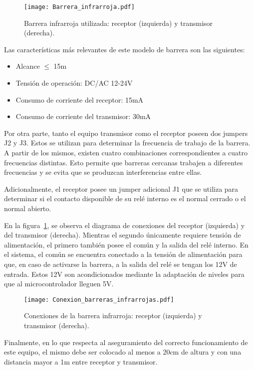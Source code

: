 \begin{figure}[H]
	\centering
	\texttt{[image: Barrera\_infrarroja.pdf]}
	\caption{Barrera infrarroja utilizada: receptor (izquierda) y transmisor (derecha).}
	\label{fig:img_Barrera_infrarroja}
\end{figure}

Las características más relevantes de este modelo de barrera son las siguientes:
\begin{itemize}
	\item Alcance $\leq$ 15m
	\item Tensión de operación: DC/AC 12-24V
	\item Consumo de corriente del receptor: 15mA
	\item Consumo de corriente del transmisor: 30mA
\end{itemize}

Por otra parte, tanto el equipo transmisor como el receptor poseen dos jumpers J2 y J3. Estos se utilizan para determinar la frecuencia de trabajo de la barrera. A partir de los mismos, existen cuatro combinaciones correspondientes a cuatro frecuencias distintas. Esto permite que barreras cercanas trabajen a diferentes frecuencias y se evita que se produzcan interferencias entre ellas.

Adicionalmente, el receptor posee un jumper adicional J1 que se utiliza para determinar si el contacto disponible de su relé interno es el normal cerrado o el normal abierto.

En la figura~\ref{fig:img_Barrera_infrarroja}, se observa el diagrama de conexiones del receptor (izquierda) y del transmisor (derecha). Mientras el segundo únicamente requiere tensión de alimentación, el primero también posee el común y la salida del relé interno. En el sistema, el común se encuentra conectado a la tensión de alimentación para que, en caso de activarse la barrera, a la salida del relé se tengan los 12V de entrada. Estos 12V son acondicionados mediante la adaptación de niveles para que al microcontrolador lleguen 5V. 

\begin{figure}[H]
	\centering
	\texttt{[image: Conexion\_barreras\_infrarrojas.pdf]}
	\caption{Conexiones de la barrera infrarroja: receptor (izquierda) y transmisor (derecha).}
	\label{fig:img_Conexion_barreras_infrarrojas}
\end{figure}

Finalmente, en lo que respecta al aseguramiento del correcto funcionamiento de este equipo, el mismo debe ser colocado al menos a 20cm de altura y con una distancia mayor a 1m entre receptor y transmisor.


